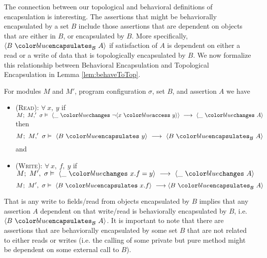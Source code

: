 \documentclass[acmsmall,review,anonymous]{acmart}\settopmatter{printfolios=true,printccs=false,printacmref=false}
\begin{document}
The connection between our topological and behavioral definitions of encapsulation is
interesting. The assertions that might be behaviorally encapsulated by a set $B$ include
those assertions that are dependent on objects that are either in $B$, or encapsulated 
by $B$. More specifically, $\bencapsulates{B}{A}$ if satisfaction of $A$ is dependent 
on either a read or a write of data that is topologically encapsulated by $B$.
We now formalize this relationship between Behavioral Encapsulation and Topological Encapsulation in Lemma \ref{lem:behaveToTop}.
\begin{lemma}
\label{lem:behaveToTop}
For modules $M$ and $M'$, program configuration $\sigma$, set $B$, and assertion $A$ we have
\begin{itemize}
\item
(\textsc{Read}):
$\forall\ x,\ y$ if $M;\ M,'\ \sigma \vDash\ \changes{\_}{\neg\access{x}{y}}\ \longrightarrow\ \changes{\_}{A}$ then
$$M;\ M,'\ \sigma \vDash\ \encapsulates{B}{y}\ \longrightarrow\ \bencapsulates{B}{A}$$ and
\item
(\textsc{Write}):
$\forall\ x,\ f,\ y$ if $M;\ M',\ \sigma \vDash\ \changes{\_}{x.f = y}\ \longrightarrow\ \changes{\_}{A}$ 
$$M;\ M',\ \sigma \vDash\ \encapsulates{B}{x.f}\ \longrightarrow \bencapsulates{B}{A}$$
\end{itemize}
\end{lemma}
That is any write to fields/read from objects encapsulated by 
$B$ implies that any assertion $A$ dependent on that write/read is behaviorally 
encapsulated by $B$, i.e. $\bencapsulates{B}{A}$.
It is important to note that there are assertions that are behaviorally encapsulated
by some set $B$ that are not related to either reads or writes (i.e. the calling of some private but pure method might be dependent on some external call to $B$).
\end{document}
